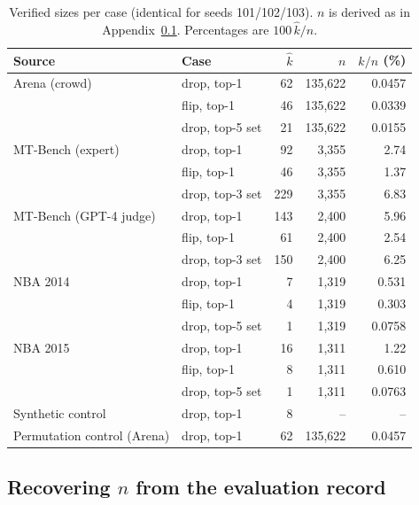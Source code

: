\documentclass{article}
\newcommand{\kver}{\hat{k}}
\begin{document}
\begin{table}[h]
\centering
\caption{Verified sizes per case (identical for seeds 101/102/103). $n$ is derived as in Appendix~\ref{app:derivation}. Percentages are $100\,\kver/n$.}
\label{tab:percase}
\small
\begin{tabular}{@{}llrrr@{}}
\toprule
Source & Case & $\kver$ & $n$ & $\kver/n$ (\%) \\
\midrule
Arena (crowd) & drop, top-1 & 62 & 135{,}622 & 0.0457 \\
 & flip, top-1 & 46 & 135{,}622 & 0.0339 \\
 & drop, top-5 set & 21 & 135{,}622 & 0.0155 \\
MT-Bench (expert) & drop, top-1 & 92 & 3{,}355 & 2.74 \\
 & flip, top-1 & 46 & 3{,}355 & 1.37 \\
 & drop, top-3 set & 229 & 3{,}355 & 6.83 \\
MT-Bench (GPT-4 judge) & drop, top-1 & 143 & 2{,}400 & 5.96 \\
 & flip, top-1 & 61 & 2{,}400 & 2.54 \\
 & drop, top-3 set & 150 & 2{,}400 & 6.25 \\
NBA 2014 & drop, top-1 & 7 & 1{,}319 & 0.531 \\
 & flip, top-1 & 4 & 1{,}319 & 0.303 \\
 & drop, top-5 set & 1 & 1{,}319 & 0.0758 \\
NBA 2015 & drop, top-1 & 16 & 1{,}311 & 1.22 \\
 & flip, top-1 & 8 & 1{,}311 & 0.610 \\
 & drop, top-5 set & 1 & 1{,}311 & 0.0763 \\
\midrule
Synthetic control & drop, top-1 & 8 & -- & -- \\
Permutation control (Arena) & drop, top-1 & 62 & 135{,}622 & 0.0457 \\
\bottomrule
\end{tabular}
\end{table}

\subsection{Recovering $n$ from the evaluation record}
\label{app:derivation}
\end{document}
